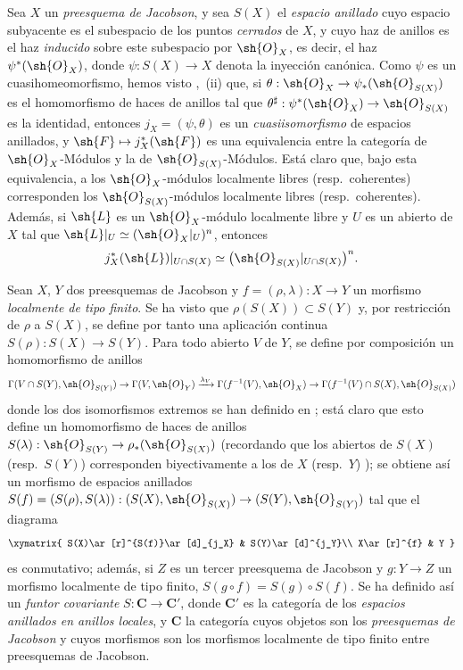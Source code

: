 \begin{env}[10.9.1]
\label{IV.10.9.1}
Sea $X$ un \emph{preesquema de Jacobson}, y sea $S(X)$ el \emph{espacio anillado} cuyo espacio subyacente es el subespacio de los puntos \emph{cerrados} de $X$, y cuyo haz de anillos es el haz \emph{inducido} sobre este subespacio por $\sh{O}_X$, es decir, el haz $\psi^*(\sh{O}_X)$, donde $\psi:S(X)\to X$ denota la inyección canónica.
Como $\psi$ es un
cuasihomeomorfismo, hemos visto ,~(ii) que, si $\theta:\sh{O}_X\to\psi_*(\sh{O}_{S(X)})$ es el homomorfismo de haces de anillos tal que $\theta^\sharp:\psi^*(\sh{O}_X)\to\sh{O}_{S(X)}$ es la identidad, entonces $j_X=(\psi,\theta)$ es un \emph{cuasiisomorfismo} de espacios anillados, y $\sh{F}\mapsto j_X^*(\sh{F})$ es una equivalencia entre la categoría de $\sh{O}_X$-Módulos y la de $\sh{O}_{S(X)}$-Módulos.
Está claro que, bajo esta equivalencia, a los $\sh{O}_X$-módulos localmente libres (resp.\ coherentes) corresponden los $\sh{O}_{S(X)}$-módulos localmente libres (resp.\ coherentes). Además, si $\sh{L}$ es un $\sh{O}_X$-módulo localmente libre y $U$ es un abierto de $X$ tal que $\sh{L}|_U\simeq(\sh{O}_X|_U)^n$, entonces
\[
  j_X^*(\sh{L})|_{U\cap S(X)}
  \simeq \bigl(\sh{O}_{S(X)}|_{U\cap S(X)}\bigr)^n.
\]
\end{env}

\begin{env}[10.9.2]
\label{IV.10.9.2}
Sean $X$, $Y$ dos preesquemas de Jacobson y $f=(\rho,\lambda):X\to Y$ un morfismo \emph{localmente de tipo finito}.
Se ha visto  que $\rho(S(X))\subset S(Y)$ y, por restricción de $\rho$ a $S(X)$, se define por tanto una aplicación continua $S(\rho):S(X)\to S(Y)$.
Para todo abierto $V$ de $Y$, se define por composición un homomorfismo de anillos
\[
  \Gamma(V\cap S(Y),\sh{O}_{S(Y)})\to\Gamma(V,\sh{O}_Y)\xrightarrow{\lambda_V}\Gamma(f^{-1}(V),\sh{O}_X)\to\Gamma(f^{-1}(V)\cap S(X),\sh{O}_{S(X)})
\]
donde los dos isomorfismos extremos se han definido en ; está claro que esto define un homomorfismo de haces de anillos $S(\lambda):\sh{O}_{S(Y)}\to\rho_*(\sh{O}_{S(X)})$ (recordando que los abiertos de $S(X)$ (resp.\ $S(Y)$) corresponden biyectivamente a los de $X$ (resp.\ $Y$) ); se obtiene así un morfismo de espacios anillados $S(f)=(S(\rho),S(\lambda)):(S(X),\sh{O}_{S(X)})\to(S(Y),\sh{O}_{S(Y)})$ tal que el diagrama
\[
  \xymatrix{
    S(X)\ar[r]^{S(f)}\ar[d]_{j_X} & S(Y)\ar[d]^{j_Y}\\
    X\ar[r]^{f} & Y
  }
\]
es conmutativo; además, si $Z$ es un tercer preesquema de Jacobson y $g:Y\to Z$ un morfismo localmente de tipo finito, $S(g\circ f)=S(g)\circ S(f)$.
Se ha definido así un \emph{funtor covariante} $S:\boldsymbol{C}\to\boldsymbol{C}'$, donde $\boldsymbol{C}'$ es la categoría de los \emph{espacios anillados en anillos locales}, y $\boldsymbol{C}$ la categoría cuyos objetos son los \emph{preesquemas de Jacobson} y cuyos morfismos son los morfismos localmente de tipo finito entre preesquemas de Jacobson.
\end{env}

